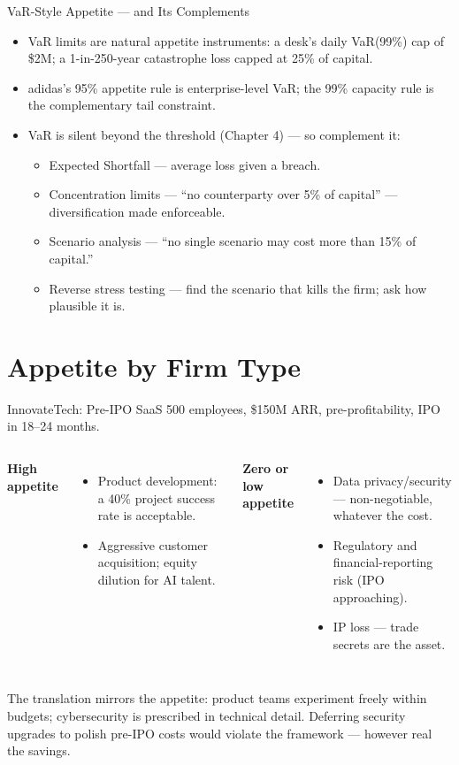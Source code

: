 \documentclass[11pt, aspectratio=169]{beamer}
\begin{document}
\begin{frame}{VaR-Style Appetite --- and Its Complements}
\begin{itemize}
  \item VaR limits are natural appetite instruments: a desk's daily VaR(99\%) cap of \$2M; a 1-in-250-year catastrophe loss capped at 25\% of capital.
  \item adidas's 95\% appetite rule is enterprise-level VaR; the 99\% capacity rule is the complementary tail constraint.
  \item VaR is silent beyond the threshold (Chapter 4) --- so complement it:
  \begin{itemize}
    \item \alert{Expected Shortfall} --- average loss given a breach.
    \item \alert{Concentration limits} --- ``no counterparty over 5\% of capital'' --- diversification made enforceable.
    \item \alert{Scenario analysis} --- ``no single scenario may cost more than 15\% of capital.''
    \item \alert{Reverse stress testing} --- find the scenario that kills the firm; ask how plausible it is.
  \end{itemize}
\end{itemize}
\end{frame}

\section{Appetite by Firm Type}

\begin{frame}{InnovateTech: Pre-IPO SaaS}
500 employees, \$150M ARR, pre-profitability, IPO in 18--24 months.
\medskip
\begin{columns}[T]
\textbf{High appetite}
\begin{itemize}
  \item Product development: a 40\% project success rate is acceptable.
  \item Aggressive customer acquisition; equity dilution for AI talent.
\end{itemize}
\textbf{Zero or low appetite}
\begin{itemize}
  \item Data privacy/security --- non-negotiable, whatever the cost.
  \item Regulatory and financial-reporting risk (IPO approaching).
  \item IP loss --- trade secrets are the asset.
\end{itemize}
\end{columns}
\medskip
The translation mirrors the appetite: product teams experiment freely within budgets; cybersecurity is prescribed in technical detail. Deferring security upgrades to polish pre-IPO costs would violate the framework --- however real the savings.
\end{frame}
\end{document}
